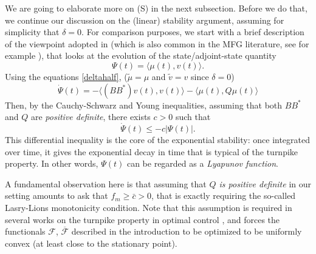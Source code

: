 \documentclass[10pt,a4paper,nouppercase,nowrite]{article}
\numberwithin{equation}{section}
\newcommand{\Sp}{{\textsc (S)} }
\theoremstyle{definition}
\begin{document}
	\medskip

	We are going to elaborate more on \Sp in the next subsection. Before we do that, we continue our discussion on the (linear) stability argument, assuming for simplicity that $\delta = 0$. For comparison purposes, we start with a brief description of the viewpoint adopted in \cite{ZP} (which is also common in the MFG literature, see for example \cite{CLLP1, CLLP2}), that looks at the evolution of the state/adjoint-state quantity
	\[
	\Psi(t) = \langle\mu(t), v(t)\rangle.
	\]
	Using the equations \eqref{deltahalf}, ($\tilde \mu = \mu$ and $\tilde v = v$ since $\delta = 0$) 
	\[
	\dot{\Psi}(t) = - \langle (BB^*)v(t), v(t)\rangle - \langle \mu(t), Q\mu(t)\rangle
	\]
	Then, by the Cauchy-Schwarz and Young inequalities, assuming that both $BB^*$ and $Q$ are \textit{positive definite}, there exists $c > 0$ such that
	\begin{equation}\label{phiineq}
	\dot{\Psi}(t) \le - c |\Psi(t)|.
	\end{equation}
	This differential inequality is the core of the exponential stability: once integrated over time, it gives the exponential decay in time that is typical of the turnpike property. In other words, $\Psi(t)$ can be regarded as a \textit{Lyapunov function}.
	
	A fundamental observation here is that assuming that \textit{$Q$ is positive definite} in our setting amounts to ask that $f_m \ge \bar c > 0$, that is exactly requiring the so-called Lasry-Lions monotonicity condition. Note that this assumption is required in several works on the turnpike property in optimal control \cite{ZP, TZh, TZZ, TZ14}, and forces the functionals $\mathcal F$, $\overline{\mathcal F}$ described in the introduction to be optimized to be uniformly convex (at least close to the stationary point).
	
	\smallskip
	
\end{document}
